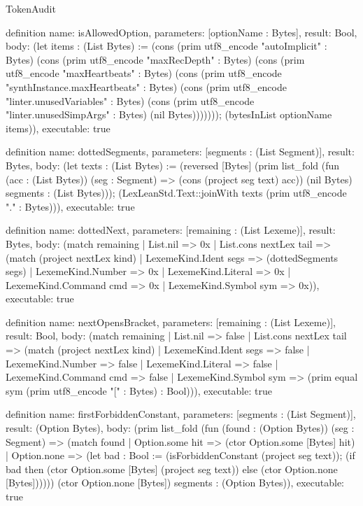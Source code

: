\begin{lexlean}{TokenAudit}
\begin{semanticmodule}
definition{
  name: isAllowedOption,
  parameters: [optionName : Bytes],
  result: Bool,
  body: (let items : (List Bytes) := (cons (prim utf8_encode "autoImplicit" : Bytes) (cons (prim utf8_encode "maxRecDepth" : Bytes) (cons (prim utf8_encode "maxHeartbeats" : Bytes) (cons (prim utf8_encode "synthInstance.maxHeartbeats" : Bytes) (cons (prim utf8_encode "linter.unusedVariables" : Bytes) (cons (prim utf8_encode "linter.unusedSimpArgs" : Bytes) (nil Bytes))))))); (bytesInList optionName items)),
  executable: true
}

definition{
  name: dottedSegments,
  parameters: [segments : (List Segment)],
  result: Bytes,
  body: (let texts : (List Bytes) := (reversed [Bytes] (prim list_fold (fun (acc : (List Bytes)) (seg : Segment) => (cons (project seg text) acc)) (nil Bytes) segments : (List Bytes))); (LexLeanStd.Text::joinWith texts (prim utf8_encode "." : Bytes))),
  executable: true
}

definition{
  name: dottedNext,
  parameters: [remaining : (List Lexeme)],
  result: Bytes,
  body: (match remaining
    | List.nil => 0x
    | List.cons nextLex tail => (match (project nextLex kind)
      | LexemeKind.Ident segs => (dottedSegments segs)
      | LexemeKind.Number => 0x
      | LexemeKind.Literal => 0x
      | LexemeKind.Command cmd => 0x
      | LexemeKind.Symbol sym => 0x)),
  executable: true
}

definition{
  name: nextOpensBracket,
  parameters: [remaining : (List Lexeme)],
  result: Bool,
  body: (match remaining
    | List.nil => false
    | List.cons nextLex tail => (match (project nextLex kind)
      | LexemeKind.Ident segs => false
      | LexemeKind.Number => false
      | LexemeKind.Literal => false
      | LexemeKind.Command cmd => false
      | LexemeKind.Symbol sym => (prim equal sym (prim utf8_encode "[" : Bytes) : Bool))),
  executable: true
}

definition{
  name: firstForbiddenConstant,
  parameters: [segments : (List Segment)],
  result: (Option Bytes),
  body: (prim list_fold (fun (found : (Option Bytes)) (seg : Segment) => (match found
    | Option.some hit => (ctor Option.some [Bytes] hit)
    | Option.none => (let bad : Bool := (isForbiddenConstant (project seg text)); (if bad then (ctor Option.some [Bytes] (project seg text)) else (ctor Option.none [Bytes]))))) (ctor Option.none [Bytes]) segments : (Option Bytes)),
  executable: true
}


\end{semanticmodule}
\end{lexlean}
